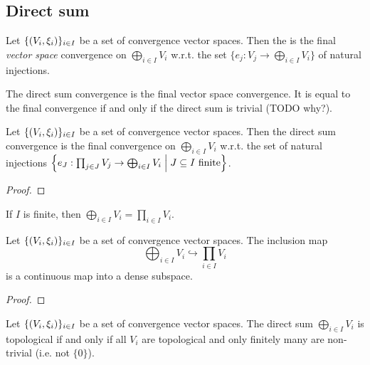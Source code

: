 \subsection{Direct sum}
\begin{definition}
Let $\{\sSet{V_i, \xi_i}\}_{i\in I}$ be a set of convergence vector spaces. Then the  is the final \emph{vector space} convergence on $\bigoplus_{i\in I}V_i$ w.r.t. the set $\{e_j: V_j \to \bigoplus_{i\in I}V_i\}$ of natural injections.
\end{definition}
The direct sum convergence is the final vector space convergence. It is equal to the final convergence if and only if the direct sum is trivial (TODO why?).

\begin{proposition}
Let $\{\sSet{V_i, \xi_i}\}_{i\in I}$ be a set of convergence vector spaces. Then the direct sum convergence is the final convergence on $\bigoplus_{i\in I}V_i$ w.r.t. the set of natural injections $\setbuilder{e_J: \prod_{j\in J} V_j \to \bigoplus_{i\in I}V_i}{\text{$J\subseteq I$ finite}}$.
\end{proposition}
\begin{proof}

\end{proof}
\begin{corollary} \label{finiteDirectSumIsProduct}
If $I$ is finite, then $\bigoplus_{i\in I}V_i = \prod_{i\in I}V_i$.
\end{corollary}

\begin{proposition}
Let $\{\sSet{V_i, \xi_i}\}_{i\in I}$ be a set of convergence vector spaces. The inclusion map
\[ \bigoplus_{i\in I}V_i \hookrightarrow \prod_{i\in I}V_i \]
is a continuous map into a dense subspace.
\end{proposition}
\begin{proof}

\end{proof}

\begin{proposition}
Let $\{\sSet{V_i, \xi_i}\}_{i\in I}$ be a set of convergence vector spaces. The direct sum $\bigoplus_{i\in I}V_i$ is topological \textup{if and only if} all $V_i$ are topological and only finitely many are non-trivial (i.e. not $\{0\}$).
\end{proposition}

